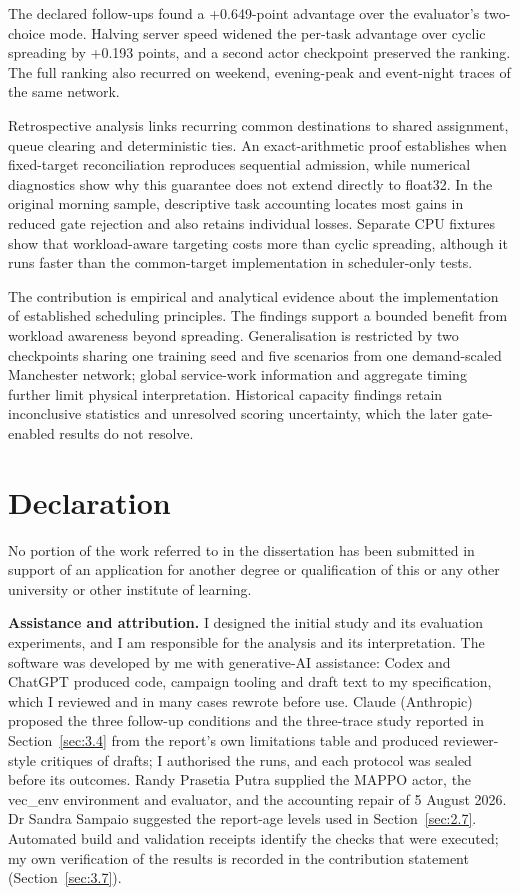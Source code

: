 \documentclass[12pt,a4paper]{article}
\begin{document}
The declared follow-ups found a +0.649-point advantage over the evaluator's two-choice mode. Halving server speed widened the per-task advantage over cyclic spreading by +0.193 points, and a second actor checkpoint preserved the ranking. The full ranking also recurred on weekend, evening-peak and event-night traces of the same network.

Retrospective analysis links recurring common destinations to shared assignment, queue clearing and deterministic ties. An exact-arithmetic proof establishes when fixed-target reconciliation reproduces sequential admission, while numerical diagnostics show why this guarantee does not extend directly to float32. In the original morning sample, descriptive task accounting locates most gains in reduced gate rejection and also retains individual losses. Separate CPU fixtures show that workload-aware targeting costs more than cyclic spreading, although it runs faster than the common-target implementation in scheduler-only tests.

The contribution is empirical and analytical evidence about the implementation of established scheduling principles. The findings support a bounded benefit from workload awareness beyond spreading. Generalisation is restricted by two checkpoints sharing one training seed and five scenarios from one demand-scaled Manchester network; global service-work information and aggregate timing further limit physical interpretation. Historical capacity findings retain inconclusive statistics and unresolved scoring uncertainty, which the later gate-enabled results do not resolve.


\clearpage
\section*{Declaration}
No portion of the work referred to in the dissertation has been submitted in support of an application for another degree or qualification of this or any other university or other institute of learning.

\textbf{Assistance and attribution.} I designed the initial study and its evaluation experiments, and I am responsible for the analysis and its interpretation. The software was developed by me with generative-AI assistance: Codex and ChatGPT produced code, campaign tooling and draft text to my specification, which I reviewed and in many cases rewrote before use. Claude (Anthropic) proposed the three follow-up conditions and the three-trace study reported in Section~\ref{sec:3.4} from the report's own limitations table and produced reviewer-style critiques of drafts; I authorised the runs, and each protocol was sealed before its outcomes. Randy Prasetia Putra supplied the MAPPO actor, the vec\_env environment and evaluator, and the accounting repair of 5 August 2026. Dr Sandra Sampaio suggested the report-age levels used in Section~\ref{sec:2.7}. Automated build and validation receipts identify the checks that were executed; my own verification of the results is recorded in the contribution statement (Section~\ref{sec:3.7}).
\end{document}
